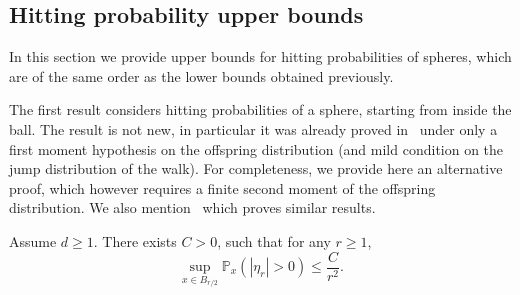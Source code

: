 \subsection{Hitting probability upper bounds}
In this section we provide upper bounds for hitting probabilities of spheres, which are of the same order as the lower bounds obtained previously.

The first result considers hitting probabilities of a sphere, starting from inside the ball.
The result is not new, in particular it was already proved in~\cite[Prop.\,10.3]{Zhu1} under only a first moment hypothesis on the offspring distribution (and mild condition on the jump distribution of the walk). For completeness, we provide here an alternative proof, which however requires a finite second moment of the offspring distribution. We also mention~\cite{Kes} which proves similar results.
\begin{proposition}\label{prop.hit.inside}
Assume $d\ge 1$. There exists $C>0$, such that for any $r\ge 1$,
\begin{equation*}
\sup_{x\in B_{r/2}} \mathbb P_x(|\eta_r|>0) \le \frac{C}{r^2}.
\end{equation*}
\end{proposition}
